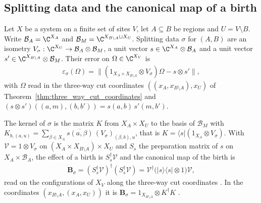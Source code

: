 \subsection{Splitting data and the canonical map of a birth}

\begin{definition}
    \label{def:party_splitting_data}
    \leanok
    Let $X$ be a system on a finite set of sites $V$, let $A\subseteq B$ be regions and
    $U=V\setminus B$. Write $\mathcal B_A=\C^{X_A}$ and
    $\mathcal B_M=\C^{X_{B\setminus A}\sqcup X_U}$. Splitting data $\sigma$ for $(A,B)$
    \cite[Lemma~6.4]{OpenAI2026PolynomialPEPS} are an isometry
    $V_\sigma:\C^{X_U}\to\mathcal B_A\otimes\mathcal B_M$, a unit vector
    $s\in\C^{X_A}\otimes\mathcal B_A$ and a unit vector
    $s'\in\C^{X_{B\setminus A}}\otimes\mathcal B_M$. Their error on $\Omega\in\C^{X_V}$ is
    \begin{align}
        \varepsilon_\sigma(\Omega)
        =\lVert(1_{X_A\times X_{B\setminus A}}\otimes V_\sigma)\Omega-s\otimes s'\rVert,
        \label{eq:party_splitting_error}
    \end{align}
    with $\Omega$ read in the three-way cut coordinates $((x_A,x_{B\setminus A}),x_U)$ of
    Theorem~\ref{thm:three_way_cut_coordinates} and
    $(s\otimes s')((a,m),(b,b'))=s(a,b)\,s'(m,b')$.

    The kernel of $\sigma$ is the matrix $K$ from $X_A\times X_U$ to the basis of
    $\mathcal B_M$ with
    $K_{b,(a,u)}=\sum_{\beta\in X_A}\overline{s(a,\beta)}\,(V_\sigma)_{(\beta,b),u}$, that is
    $K=\langle s|(1_{X_A}\otimes V_\sigma)$. With $\mathcal V=1\otimes V_\sigma$ on
    $(X_A\times X_{B\setminus A})\times X_U$ and $S_s$ the preparation matrix of $s$ on
    $X_A\times\mathcal B_A$, the effect of a birth is $S_s^\dagger\mathcal V$ and the canonical
    map of the birth is
    \begin{align}
        \mathbf B_\sigma=(S_s^\dagger\mathcal V)^\dagger(S_s^\dagger\mathcal V)
        =\mathcal V^\dagger\bigl(|s\rangle\langle s|\otimes1\bigr)\mathcal V,
        \label{eq:party_birth_map}
    \end{align}
    read on the configurations of $X_V$ along the three-way cut coordinates
    \cite[Lemma~6.5]{OpenAI2026PolynomialPEPS}. In the coordinates $(x_{B\setminus A},(x_A,x_U))$
    it is $\mathbf B_\sigma=1_{X_{B\setminus A}}\otimes K^\dagger K$
    \cite[proof of Lemma~6.5]{OpenAI2026PolynomialPEPS}.
\end{definition}

